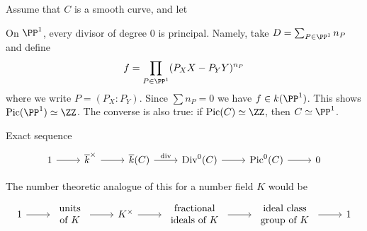 \begin{definition}
    Assume that $C$ is a smooth curve, and let 
\end{definition}
 



\begin{example}
    On $\PP^1$, every divisor of degree $0$ is principal. Namely, take $D = \sum_{P \in \PP^1} n_P$ and define
    \[ f = \prod_{P \in \PP^1} (P_X X - P_Y Y)^{n_P} \]
    where we write $P = (P_X : P_Y)$. Since $\sum n_P = 0$ we have $f \in k(\PP^1)$. This shows $\text{Pic}(\PP^1) \simeq \ZZ$. The converse is also true: if $\text{Pic}(C) \simeq \ZZ$, then $C \simeq \PP^1$.
\end{example}


Exact sequence
\[ \begin{tikzcd} 1 \arrow{r} & \overline{k}^\times \arrow{r} & \overline{k}(C) \arrow{r}{\text{div}} & \text{Div}^0(C) \arrow{r} & \text{Pic}^0(C) \arrow{r} & 0 \end{tikzcd} \]

The number theoretic analogue of this for a number field $K$ would be
\[ \begin{tikzcd} 1 \arrow{r} & \begin{array}{c} \text{units} \\ \text{of $K$} \end{array} \arrow{r} & K^\times \arrow{r} & \begin{array}{c} \text{fractional} \\ \text{ideals of $K$} \end{array} \arrow{r} & \begin{array}{c} \text{ideal class} \\ \text{group of $K$} \end{array} \arrow{r} & 1 \end{tikzcd} \]


